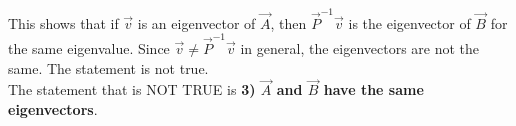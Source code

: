 \documentclass[journal]{IEEEtran}
\begin{document}
This shows that if $\vec{v}$ is an eigenvector of $\vec{A}$, then $\vec{P}^{-1}\vec{v}$ is the eigenvector of $\vec{B}$ for the same eigenvalue. Since $\vec{v} \neq \vec{P}^{-1}\vec{v}$ in general, the eigenvectors are not the same. The statement is not true. \\
The statement that is NOT TRUE is \textbf{3) $\vec{A}$ and $\vec{B}$ have the same eigenvectors}.
\end{document}
